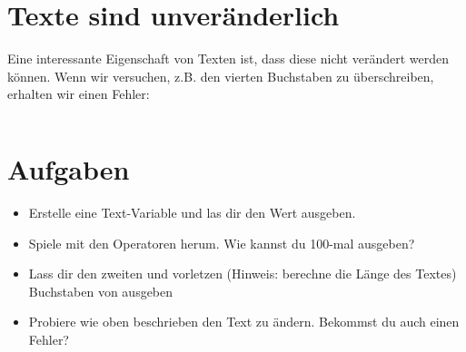 \documentclass{\VorlagenPfad/coderdojokatext}
\begin{document}
\section{Texte sind unveränderlich}
Eine interessante Eigenschaft von Texten ist, dass diese nicht verändert werden können. 
Wenn wir versuchen, z.B. den vierten Buchstaben zu überschreiben, erhalten wir einen Fehler:

\inputminted[firstline=22, lastline=23]{python}{../../../Beispiele/text.py}

\section{Aufgaben}
\begin{itemize}
	\item Erstelle eine Text-Variable und las dir den Wert ausgeben.
	\item Spiele mit den Operatoren herum. Wie kannst du 100-mal  ausgeben?
	\item Lass dir den zweiten und vorletzen (Hinweis: berechne die Länge des Textes) Buchstaben von   ausgeben
	\item Probiere wie oben beschrieben den Text zu ändern. Bekommst du auch einen Fehler?
\end{itemize}
\end{document}
